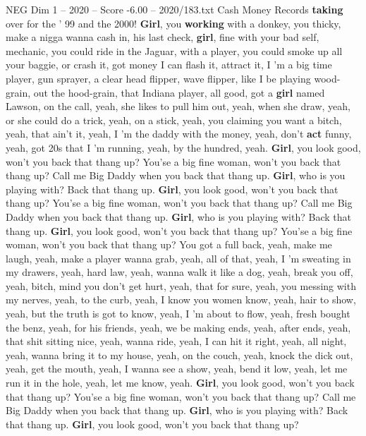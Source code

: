 \begin{textsample}{NEG Dim 1 – 2020 – Score -6.00 – 2020/183.txt}  \label{ex:f1_neg_039}
Cash Money Records \textbf{taking} over for the ' 99 and the 2000! \textbf{Girl}, you \textbf{working} with a donkey, you thicky, make a nigga wanna cash in, his last check, \textbf{girl}, fine with your bad self, mechanic, you could ride in the Jaguar, with a player, you could smoke up all your baggie, or crash it, got money I can flash it, attract it, I 'm a big time player, gun sprayer, a clear head flipper, wave flipper, like I be playing wood-grain, out the hood-grain, that Indiana player, all good, got a \textbf{girl} named Lawson, on the call, yeah, she likes to pull him out, yeah, when she draw, yeah, or she could do a trick, yeah, on a stick, yeah, you claiming you want a bitch, yeah, that ain't it, yeah, I 'm the daddy with the money, yeah, don't \textbf{act} funny, yeah, got 20s that I 'm running, yeah, by the hundred, yeah. \textbf{Girl}, you look good, won't you back that thang up?
You'se a big fine woman, won't you back that thang up?
Call me Big Daddy when you back that thang up. \textbf{Girl}, who is you playing with?
Back that thang up. \textbf{Girl}, you look good, won't you back that thang up?
You'se a big fine woman, won't you back that thang up?
Call me Big Daddy when you back that thang up. \textbf{Girl}, who is you playing with?
Back that thang up. \textbf{Girl}, you look good, won't you back that thang up?
You'se a big fine woman, won't you back that thang up?
You got a full back, yeah, make me laugh, yeah, make a player wanna grab, yeah, all of that, yeah, I 'm sweating in my drawers, yeah, hard law, yeah, wanna walk it like a dog, yeah, break you off, yeah, bitch, mind you don't get hurt, yeah, that for sure, yeah, you messing with my nerves, yeah, to the curb, yeah, I know you women know, yeah, hair to show, yeah, but the truth is got to know, yeah, I 'm about to flow, yeah, fresh bought the benz, yeah, for his friends, yeah, we be making ends, yeah, after ends, yeah, that shit sitting nice, yeah, wanna ride, yeah, I can hit it right, yeah, all night, yeah, wanna bring it to my house, yeah, on the couch, yeah, knock the dick out, yeah, get the mouth, yeah, I wanna see a show, yeah, bend it low, yeah, let me run it in the hole, yeah, let me know, yeah. \textbf{Girl}, you look good, won't you back that thang up?
You'se a big fine woman, won't you back that thang up?
Call me Big Daddy when you back that thang up. \textbf{Girl}, who is you playing with?
Back that thang up. \textbf{Girl}, you look good, won't you back that thang up?

\end{textsample}
